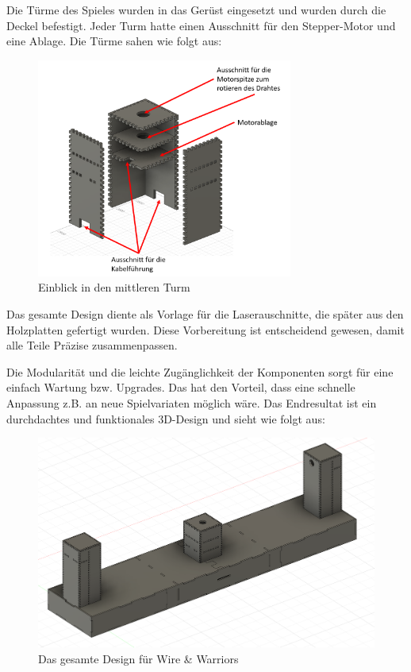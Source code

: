 Die Türme des Spieles wurden in das Gerüst eingesetzt und wurden durch die Deckel befestigt. Jeder Turm hatte einen Ausschnitt für den Stepper-Motor und eine Ablage. Die Türme sahen wie folgt aus:

\begin{figure}[H]
 \centerline{\includegraphics[width=0.75\textwidth,scale=1]{./images/turm_mitte.png}}
 \caption{Einblick in den mittleren Turm}\label{imageLabel}
\end{figure} 


Das gesamte Design diente als Vorlage für die Laserauschnitte, die später aus den Holzplatten gefertigt wurden. Diese Vorbereitung ist entscheidend gewesen, damit alle Teile Präzise zusammenpassen. 

Die Modularität und die leichte Zugänglichkeit der Komponenten sorgt für eine einfach Wartung bzw. Upgrades. Das hat den Vorteil, dass eine schnelle Anpassung z.B. an neue Spielvariaten möglich wäre. Das Endresultat ist ein durchdachtes und funktionales 3D-Design und sieht wie folgt aus: 

\begin{figure}[H]
 \centerline{\includegraphics[width=\textwidth,scale=1]{./images/gesamt_design.png}}
 \caption{Das gesamte Design für Wire \& Warriors}\label{imageLabel}
\end{figure} 

